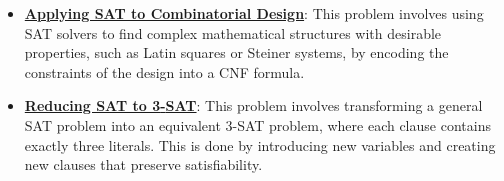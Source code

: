 \documentclass{article}%
\begin{document}
\begin{itemize}[leftmargin=*]
\item \href{https://purdue.brightspace.com/d2l/common/assets/pdfjs-d2l-dist/1.0.14-legacy/web/viewer.html?file=\%2Fcontent\%2Fenforced\%2F1095467-wl.202510.CS.24300.001\%2F13L1-Logic.pdf\%3Fou\%3D1095467\&lang=en-us\&container=d2l-fileviewer-rendered-pdf\&fullscreen=d2l-fileviewer-rendered-pdf-dialog\&height=667#page=22}{\textbf{Applying SAT to Combinatorial Design}}: This problem involves using SAT solvers to find complex mathematical structures with desirable properties, such as Latin squares or Steiner systems, by encoding the constraints of the design into a CNF formula.%
\item \href{https://purdue.brightspace.com/d2l/common/assets/pdfjs-d2l-dist/1.0.14-legacy/web/viewer.html?file=\%2Fcontent\%2Fenforced\%2F1095467-wl.202510.CS.24300.001\%2F13L1-Logic.pdf\%3Fou\%3D1095467\&lang=en-us\&container=d2l-fileviewer-rendered-pdf\&fullscreen=d2l-fileviewer-rendered-pdf-dialog\&height=667#page=24}{\textbf{Reducing SAT to 3{-}SAT}}: This problem involves transforming a general SAT problem into an equivalent 3-SAT problem, where each clause contains exactly three literals. This is done by introducing new variables and creating new clauses that preserve satisfiability.%
\end{itemize}%
\end{document}
